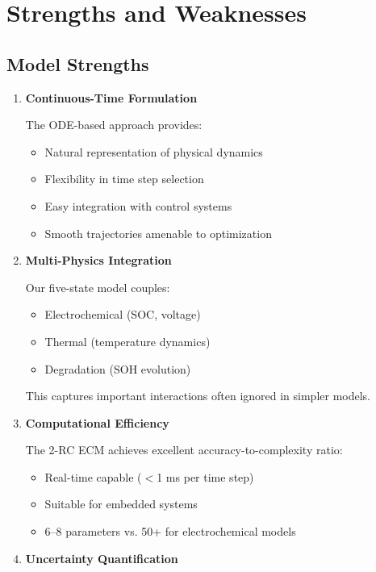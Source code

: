 \section{Strengths and Weaknesses}
\label{sec:strengths}

\subsection{Model Strengths}
\label{subsec:strengths}

\begin{enumerate}
    \item \textbf{Continuous-Time Formulation}
    
    The ODE-based approach provides:
    \begin{itemize}
        \item Natural representation of physical dynamics
        \item Flexibility in time step selection
        \item Easy integration with control systems
        \item Smooth trajectories amenable to optimization
    \end{itemize}
    
    \item \textbf{Multi-Physics Integration}
    
    Our five-state model couples:
    \begin{itemize}
        \item Electrochemical (SOC, voltage)
        \item Thermal (temperature dynamics)
        \item Degradation (SOH evolution)
    \end{itemize}
    This captures important interactions often ignored in simpler models.
    
    \item \textbf{Computational Efficiency}
    
    The 2-RC ECM achieves excellent accuracy-to-complexity ratio:
    \begin{itemize}
        \item Real-time capable ($<$1 ms per time step)
        \item Suitable for embedded systems
        \item 6--8 parameters vs. 50+ for electrochemical models
    \end{itemize}
    
    \item \textbf{Uncertainty Quantification}
    

\end{enumerate}
